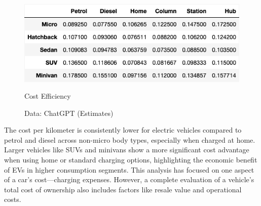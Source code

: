 \begin{figure}[H]
	\begin{center}
		\includegraphics[width=\linewidth]{images/cost_efficiency.png}
		\caption{Cost Efficiency}
		\label{fig: Driving Efficiency}
		\caption*{Data: ChatGPT (Estimates)}
	\end{center}	
\end{figure}
The cost per kilometer is consistently lower for electric vehicles compared to petrol and diesel across non-micro body types, especially when charged at home. Larger vehicles like SUVs and minivans show a more significant cost advantage when using home or standard charging options, highlighting the economic benefit of EVs in higher consumption segments. This analysis has focused on one aspect of a car's cost—charging expenses. However, a complete evaluation of a vehicle’s total cost of ownership also includes factors like resale value and operational costs.